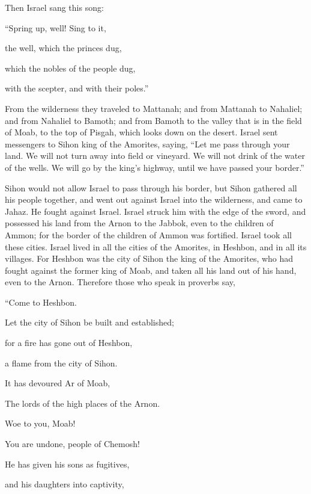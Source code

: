 {\par }{\PP {}Then Israel sang this song:
\par }{\Q “Spring up, well! Sing to it,
\par }{\QB {}the well, which the princes dug,
\par }{\QB which the nobles of the people dug,
\par }{\QB with the scepter, and with their poles.”
\par }{\PP From the wilderness they traveled to Mattanah;
and from Mattanah to Nahaliel; and from Nahaliel to Bamoth;
and from Bamoth to the valley that is in the field of Moab, to the top of Pisgah, which looks down on the desert.
Israel sent messengers to Sihon king of the Amorites, saying,
“Let me pass through your land. We will not turn away into field or vineyard. We will not drink of the water of the wells. We will go by the king’s highway, until we have passed your border.”
\par }{\PP {}Sihon would not allow Israel to pass through his border, but Sihon gathered all his people together, and went out against Israel into the wilderness, and came to Jahaz. He fought against Israel.
Israel struck him with the edge of the sword, and possessed his land from the Arnon to the Jabbok, even to the children of Ammon; for the border of the children of Ammon was fortified.
Israel took all these cities. Israel lived in all the cities of the Amorites, in Heshbon, and in all its villages.
For Heshbon was the city of Sihon the king of the Amorites, who had fought against the former king of Moab, and taken all his land out of his hand, even to the Arnon.
Therefore those who speak in proverbs say,
\par }{\Q “Come to Heshbon.
\par }{\QB Let the city of Sihon be built and established;
\par }{\Q {}for a fire has gone out of Heshbon,
\par }{\QB a flame from the city of Sihon.
\par }{\Q It has devoured Ar of Moab,
\par }{\QB The lords of the high places of the Arnon.
\par }{\Q {}Woe to you, Moab!
\par }{\QB You are undone, people of Chemosh!
\par }{\Q He has given his sons as fugitives,
\par }{\QB and his daughters into captivity,
}
